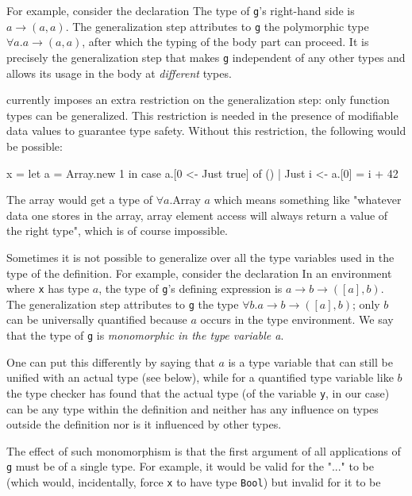 For example, consider the declaration 
The type of \texttt{g}'s right-hand side is $a \rightarrow{} (a,a)$. The generalization step attributes to \texttt{g} the polymorphic type $\forall a. a \rightarrow{} (a,a)$, after which the typing of the body part can proceed. It is precisely the generalization step that makes \texttt{g} independent of any other types and allows its usage in the body at \emph{different} types.

\frege{} currently imposes an extra restriction on the generalization step: only function types can be generalized. This restriction is needed in the presence of modifiable data values to guarantee type safety. Without this restriction, the following would be possible:
\begin{code}
    x = let
        a = Array.new 1
      in case a.[0 <- Just true] of
            () | Just i <- a.[0] = i + 42
\end{code}
The array would get a type of $\forall a$.Array $a$ which means something like "whatever data one stores in the array, array element access will always return a value of the right type", which is of course impossible.

Sometimes it is not possible to generalize over all the type variables used in the type of the definition. For example, consider the declaration  
In an environment where \texttt{x} has type $a$, the type of \texttt{g}'s defining expression is $a \rightarrow{} b \rightarrow{} ([a],b)$. The generalization step attributes to \texttt{g} the type $\forall{} b$.$a \rightarrow{} b \rightarrow{} ([a],b)$; only $b$ can be universally quantified because $a$ occurs in the type environment. We say that the type of \texttt{g} is \emph{monomorphic in the type variable a}.

One can put this differently by saying that $a$ is a type variable that  can still be unified with an actual type (see below), while for a quantified type variable like $b$ the type checker has found that the actual type (of the variable \texttt{y}, in our case) can be any type within the definition and neither has any influence on types outside the definition nor is it influenced by other types.

The effect of such monomorphism is that the first argument of all applications of \texttt{g} must be of a single type. For example, it would be valid for the "..." to be 
(which would, incidentally, force \texttt{x} to have type \texttt{Bool}) but invalid for it to be 

